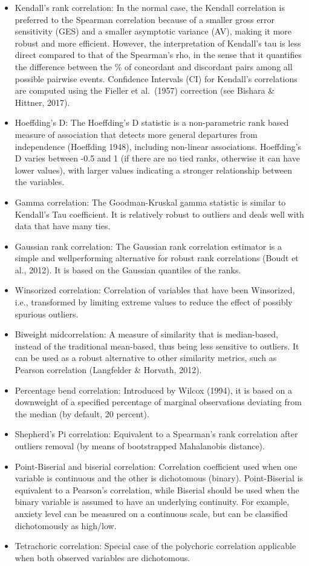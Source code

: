 \documentclass[
]{report}
\begin{document}
\begin{itemize}
\item
  Kendall's rank correlation: In the normal case, the Kendall correlation is preferred
  to the Spearman correlation because of a smaller gross error sensitivity (GES) and a
  smaller asymptotic variance (AV), making it more robust and more efficient. However,
  the interpretation of Kendall's tau is less direct compared to that of the Spearman's rho,
  in the sense that it quantifies the difference between the \% of concordant and discordant
  pairs among all possible pairwise events. Confidence Intervals (CI) for Kendall's correlations are computed using the Fieller et al.~(1957) correction (see Bishara \& Hittner,
  2017).
\item
  Hoeffding's D: The Hoeffding's D statistic is a non-parametric rank based measure of association
  that detects more general departures from independence (Hoeffding 1948), including non-linear
  associations. Hoeffding's D varies between -0.5 and 1 (if there are no tied ranks, otherwise it can
  have lower values), with larger values indicating a stronger relationship between the variables.
\item
  Gamma correlation: The Goodman-Kruskal gamma statistic is similar to Kendall's Tau coefficient. It
  is relatively robust to outliers and deals well with data that have many ties.
\item
  Gaussian rank correlation: The Gaussian rank correlation estimator is a simple and wellperforming alternative for robust rank correlations (Boudt et al., 2012). It is based on the Gaussian
  quantiles of the ranks.
\item
  Winsorized correlation: Correlation of variables that have been Winsorized, i.e., transformed by
  limiting extreme values to reduce the effect of possibly spurious outliers.
\item
  Biweight midcorrelation: A measure of similarity that is median-based, instead of
  the traditional mean-based, thus being less sensitive to outliers. It can be used as a
  robust alternative to other similarity metrics, such as Pearson correlation (Langfelder \&
  Horvath, 2012).
\item
  Percentage bend correlation: Introduced by Wilcox (1994), it is based on a downweight of a specified percentage of marginal observations deviating from the median (by
  default, 20 percent).
\item
  Shepherd's Pi correlation: Equivalent to a Spearman's rank correlation after outliers
  removal (by means of bootstrapped Mahalanobis distance).
\item
  Point-Biserial and biserial correlation: Correlation coefficient used when one variable
  is continuous and the other is dichotomous (binary). Point-Biserial is equivalent to a
  Pearson's correlation, while Biserial should be used when the binary variable is assumed
  to have an underlying continuity. For example, anxiety level can be measured on a
  continuous scale, but can be classified dichotomously as high/low.
\item
  Tetrachoric correlation: Special case of the polychoric correlation applicable when
  both observed variables are dichotomous.
\end{itemize}
\end{document}
